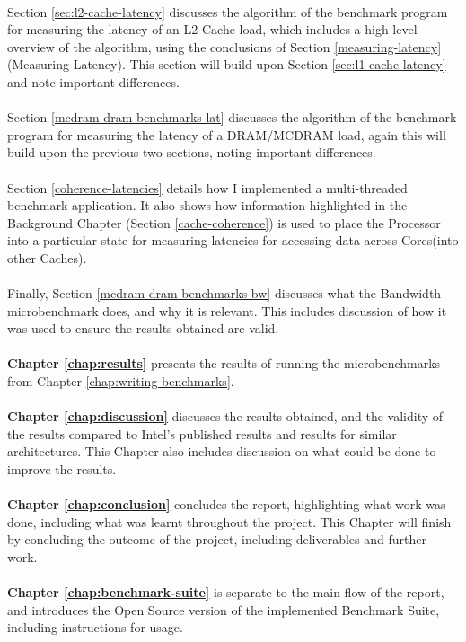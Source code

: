 \documentclass[bsc,frontabs,twoside,singlespacing,parskip,deptreport]{infthesis}     %
\begin{document}
\\
Section \ref{sec:l2-cache-latency} discusses the algorithm of the benchmark program for measuring the latency of an L2 Cache load, which includes a high-level overview of the algorithm, using the conclusions of Section \ref{measuring-latency}(Measuring Latency). This section will build upon Section \ref{sec:l1-cache-latency} and note important differences. \\
\\
Section \ref{mcdram-dram-benchmarks-lat} discusses the algorithm of the benchmark program for measuring the latency of a DRAM/MCDRAM load, again this will build upon the previous two sections, noting important differences. \\
\\
Section \ref{coherence-latencies} details how I implemented a multi-threaded benchmark application. It also shows how information highlighted in the Background Chapter (Section \ref{cache-coherence}) is used to place the Processor into a particular state for measuring latencies for accessing data across Cores(into other Caches). \\
\\
Finally, Section \ref{mcdram-dram-benchmarks-bw} discusses what the Bandwidth microbenchmark does, and why it is relevant. This includes discussion of how it was used to ensure the results obtained are valid. \\
\\
\textbf{Chapter \ref{chap:results}} presents the results of running the microbenchmarks from Chapter \ref{chap:writing-benchmarks}. \\
\\
\textbf{Chapter \ref{chap:discussion}} discusses the results obtained, and the validity of the results compared to Intel's published results and results for similar architectures. This Chapter also includes discussion on what could be done to improve the results. \\
\\
\textbf{Chapter \ref{chap:conclusion}} concludes the report, highlighting what work was done, including what was learnt throughout the project. This Chapter will finish by concluding the outcome of the project, including deliverables and further work. \\
\\
\textbf{Chapter \ref{chap:benchmark-suite}} is separate to the main flow of the report, and introduces the Open Source version of the implemented Benchmark Suite, including instructions for usage.
\end{document}
